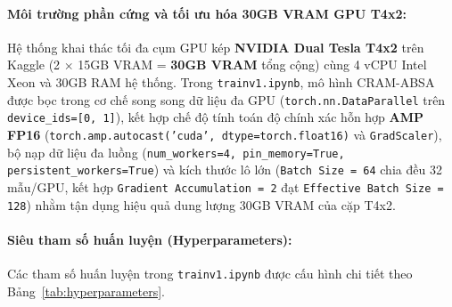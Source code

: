 \documentclass[pdflatex,sn-mathphys-num]{sn-jnl}
\theoremstyle{thmstyleone}
\theoremstyle{thmstyletwo}
\theoremstyle{thmstylethree}
\begin{document}
\paragraph{Môi trường phần cứng và tối ưu hóa 30GB VRAM GPU T4x2:}
Hệ thống khai thác tối đa cụm GPU kép \textbf{NVIDIA Dual Tesla T4x2} trên Kaggle (2 $\times$ 15GB VRAM = \textbf{30GB VRAM} tổng cộng) cùng 4 vCPU Intel Xeon và 30GB RAM hệ thống. Trong \texttt{trainv1.ipynb}, mô hình CRAM-ABSA được bọc trong cơ chế song song dữ liệu đa GPU (\texttt{torch.nn.DataParallel} trên \texttt{device\_ids=[0, 1]}), kết hợp chế độ tính toán độ chính xác hỗn hợp \textbf{AMP FP16} (\texttt{torch.amp.autocast('cuda', dtype=torch.float16)} và \texttt{GradScaler}), bộ nạp dữ liệu đa luồng (\texttt{num\_workers=4, pin\_memory=True, persistent\_workers=True}) và kích thước lô lớn (\texttt{Batch Size = 64} chia đều 32 mẫu/GPU, kết hợp \texttt{Gradient Accumulation = 2} đạt \texttt{Effective Batch Size = 128}) nhằm tận dụng hiệu quả dung lượng 30GB VRAM của cặp T4x2.

\paragraph{Siêu tham số huấn luyện (Hyperparameters):}
Các tham số huấn luyện trong \texttt{trainv1.ipynb} được cấu hình chi tiết theo Bảng~\ref{tab:hyperparameters}.
\end{document}
